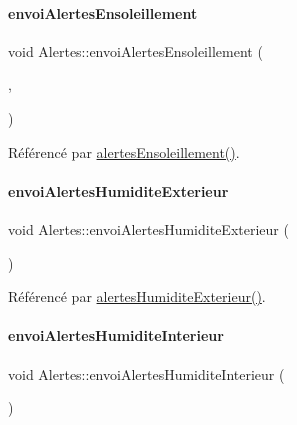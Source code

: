 \paragraph{\texorpdfstring{envoi\+Alertes\+Ensoleillement}{envoiAlertesEnsoleillement}}
{\footnotesize\ttfamily void Alertes\+::envoi\+Alertes\+Ensoleillement (\begin{DoxyParamCaption}\item[{\hyperlink{parametres_8h_aaa6de8207c94675264c90b10b613368d}{Seuils\+Alertes}}]{,  }\item[{double}]{ }\end{DoxyParamCaption})\hspace{0.3cm}{\ttfamily [signal]}}



Référencé par \hyperlink{class_alertes_ae7ad960c530a6a7e82df3ed55d159a68}{alertes\+Ensoleillement()}.

\mbox{\label{class_alertes_a9a4f2ada9fbf4cf505d6d94831d8e413}} 
\paragraph{\texorpdfstring{envoi\+Alertes\+Humidite\+Exterieur}{envoiAlertesHumiditeExterieur}}
{\footnotesize\ttfamily void Alertes\+::envoi\+Alertes\+Humidite\+Exterieur (\begin{DoxyParamCaption}\item[{\hyperlink{parametres_8h_aaa6de8207c94675264c90b10b613368d}{Seuils\+Alertes}}]{ }\end{DoxyParamCaption})\hspace{0.3cm}{\ttfamily [signal]}}



Référencé par \hyperlink{class_alertes_a8606946eaa04dfd29bb7951b2b850a04}{alertes\+Humidite\+Exterieur()}.

\mbox{\label{class_alertes_a6d96d5a6e5a1e3c518c45e295a5b4ddf}} 
\paragraph{\texorpdfstring{envoi\+Alertes\+Humidite\+Interieur}{envoiAlertesHumiditeInterieur}}
{\footnotesize\ttfamily void Alertes\+::envoi\+Alertes\+Humidite\+Interieur (\begin{DoxyParamCaption}\item[{\hyperlink{parametres_8h_aaa6de8207c94675264c90b10b613368d}{Seuils\+Alertes}}]{ }\end{DoxyParamCaption})\hspace{0.3cm}{\ttfamily [signal]}}



